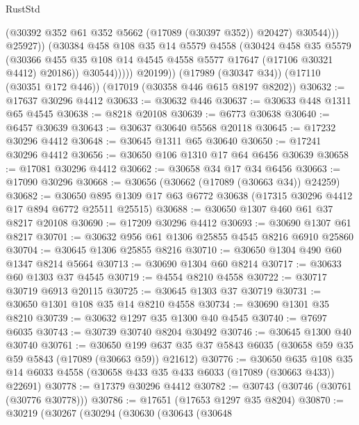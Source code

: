 \begin{lexlean}{RustStd}
\begin{coremodule}
                          (@30392 @352 @61 @352 @5662 (@17089 (@30397 @352)) @20427)
                          @30544)))
                    @25927))
                (@30384
                  @458
                  @108
                  @35
                  @14
                  @5579
                  @4558
                  (@30424
                    @458
                    @35
                    @5579
                    (@30366
                      @455
                      @35
                      @108
                      @14
                      @4545
                      @4558
                      @5577
                      @17647
                      (@17106 @30321 @4412)
                      @20186))
                  @30544)))))
        @20199))
    (@17989 (@30347 @34))
    (@17110 (@30351 @172 @446))
    (@17019 (@30358 @446 @615 @8197 @8202))
@30632 := @17637 @30296 @4412
@30633 := @30632 @446
@30637 := @30633 @448 @1311 @65 @4545
@30638 := @8218 @20108
@30639 := @6773 @30638
@30640 := @6457 @30639
@30643 := @30637 @30640 @5568 @20118
@30645 := @17232 @30296 @4412
@30648 := @30645 @1311 @65 @30640
@30650 := @17241 @30296 @4412
@30656 := @30650 @106 @1310 @17 @64 @6456 @30639
@30658 := @17081 @30296 @4412
@30662 := @30658 @34 @17 @34 @6456
@30663 := @17090 @30296
@30668 := @30656 (@30662 (@17089 (@30663 @34)) @24259)
@30682 := @30650 @895 @1309 @17 @63 @6772 @30638 (@17315 @30296 @4412 @17 @894 @6772 @25511 @25515)
@30688 := @30650 @1307 @460 @61 @37 @8217 @20108
@30690 := @17209 @30296 @4412
@30693 := @30690 @1307 @61 @8217
@30701 := @30632 @956 @61 @1306 @25855 @4545 @8216 @6910 @25860
@30704 := @30645 @1306 @25855 @8216
@30710 := @30650 @1304 @490 @60 @1347 @8214 @5664
@30713 := @30690 @1304 @60 @8214
@30717 := @30633 @60 @1303 @37 @4545
@30719 := @4554 @8210 @4558
@30722 := @30717 @30719 @6913 @20115
@30725 := @30645 @1303 @37 @30719
@30731 := @30650 @1301 @108 @35 @14 @8210 @4558
@30734 := @30690 @1301 @35 @8210
@30739 := @30632 @1297 @35 @1300 @40 @4545
@30740 := @7697 @6035
@30743 := @30739 @30740 @8204 @30492
@30746 := @30645 @1300 @40 @30740
@30761 := @30650
    @199
    @637
    @35
    @37
    @5843
    @6035
    (@30658 @59 @35 @59 @5843 (@17089 (@30663 @59)) @21612)
@30776 := @30650
    @635
    @108
    @35
    @14
    @6033
    @4558
    (@30658 @433 @35 @433 @6033 (@17089 (@30663 @433)) @22691)
@30778 := @17379 @30296 @4412
@30782 := @30743 (@30746 (@30761 (@30776 @30778)))
@30786 := @17651 (@17653 @1297 @35 @8204)
@30870 := @30219
    (@30267
      (@30294
        (@30630
          (@30643
            (@30648

\end{coremodule}
\end{lexlean}
